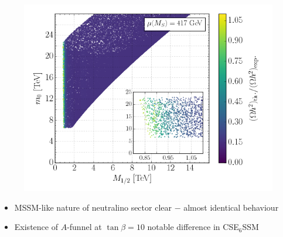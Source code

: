 \documentclass[10pt,aspectratio=169]{beamer}
\begin{document}
\begin{frame}
\begin{columns}[t]
\begin{column}{0.5\textwidth}
\begin{figure}
        \includegraphics[width=\textwidth]{cmssm_mupos400GeV_m12m0_Omega}
      \end{figure}
      \vspace{-13pt}
      \begin{itemize}
        \item MSSM-like nature of neutralino sector clear $-$
          almost identical behaviour
        \item {\color{blue} Existence of $A$-funnel at $\tan\beta = 10$ notable
          difference in CSE$_6$SSM}
      \end{itemize}
      \end{column}
  \end{columns}
\end{frame}
\end{document}

